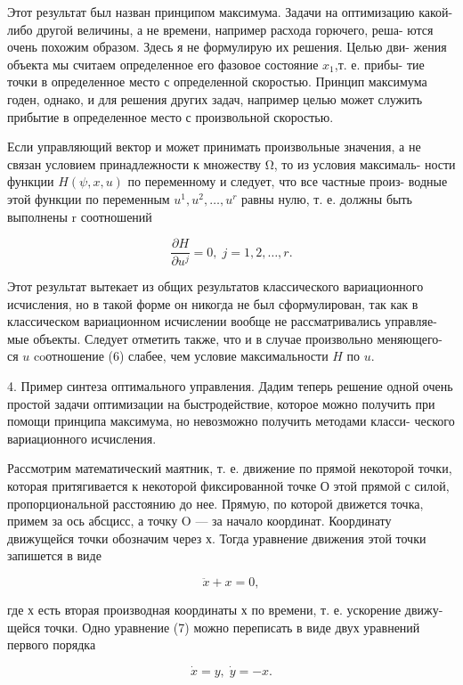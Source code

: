 \documentclass[10pt]{article}
\begin{document}
Этот результат был назван принципом максимума. Задачи на оптимизацию какой-либо другой величины, а не времени, например расхода горючего, реша- ются очень похожим образом. Здесь я не формулирую их решения. Целью дви- жения объекта мы считаем определенное его фазовое состояние \({x}_{1}\),т. е. прибы- тие точки в определенное место с определенной скоростью. Принцип максимума годен, однако, и для решения других задач, например целью может служить прибытие в определенное место с произвольной скоростью.

Если управляющий вектор и может принимать произвольные значения, а не связан условием принадлежности к множеству Ω, то из условия максималь- ности функции \(H\left( {\psi,x,u}\right)\) по переменному и следует, что все частные произ- водные этой функции по переменным \({u}^{1},{u}^{2},\ldots,{u}^{r}\) равны нулю, т. е. должны быть выполнены r соотношений

\[
\frac{\partial H}{\partial {u}^{j}} = 0,\;j = 1,2,\ldots,r. \tag{6}
\]

Этот результат вытекает из общих результатов классического вариационного исчисления, но в такой форме он никогда не был сформулирован, так как в классическом вариационном исчислении вообще не рассматривались управляе- мые объекты. Следует отметить также, что и в случае произвольно меняющего- ся \(u\) coотношение (6) слабее, чем условие максимальности \(H\) по \(u\).

4. Пример синтеза оптимального управления. Дадим теперь решение одной очень простой задачи оптимизации на быстродействие, которое можно получить при помощи принципа максимума, но невозможно получить методами класси- ческого вариационного исчисления.

Рассмотрим математический маятник, т. е. движение по прямой некоторой точки, которая притягивается к некоторой фиксированной точке О этой прямой с силой, пропорциональной расстоянию до нее. Прямую, по которой движется точка, примем за ось абсцисс, а точку O — за начало координат. Координату движущейся точки обозначим через х. Тогда уравнение движения этой точки запишется в виде

\[
\ddot{x} + x = 0, \tag{7}
\]

где х есть вторая производная координаты х по времени, т. е. ускорение движу- щейся точки. Одно уравнение (7) можно переписать в виде двух уравнений первого порядка

\[
\dot{x} = y,\;\dot{y} =  - x. \tag{8}
\]
\end{document}
